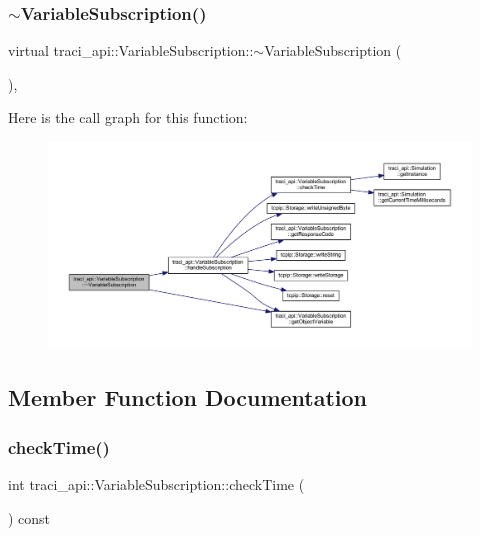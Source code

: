 \subsubsection{\texorpdfstring{$\sim$\+Variable\+Subscription()}{~VariableSubscription()}}
{\footnotesize\ttfamily virtual traci\+\_\+api\+::\+Variable\+Subscription\+::$\sim$\+Variable\+Subscription (\begin{DoxyParamCaption}{ }\end{DoxyParamCaption})\hspace{0.3cm}{\ttfamily [inline]}, {\ttfamily [virtual]}}

Here is the call graph for this function\+:
\nopagebreak
\begin{figure}[H]
\begin{center}
\leavevmode
\includegraphics[width=350pt]{classtraci__api_1_1_variable_subscription_afc66a609515b051a28df4df35cbcbe61_cgraph}
\end{center}
\end{figure}


\subsection{Member Function Documentation}
\mbox{\label{classtraci__api_1_1_variable_subscription_a6e17a9560c53c7c9543599f93caeeaf8}} 
\subsubsection{\texorpdfstring{check\+Time()}{checkTime()}}
{\footnotesize\ttfamily int traci\+\_\+api\+::\+Variable\+Subscription\+::check\+Time (\begin{DoxyParamCaption}{ }\end{DoxyParamCaption}) const}

